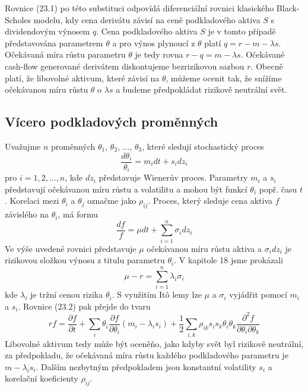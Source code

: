 \documentclass[a4paper]{book}
\begin{document}
Rovnice (23.1) po této substituci odpovídá diferenciální rovnici klasického Black-Scholes modelu, kdy cena derivátu závisí na ceně podkladového aktiva $S$ s dividendovým výnosem $q$. Cena podkladového aktiva $S$ je v tomto případě představována parametrem $\theta$ a pro výnos plynoucí z $\theta$ platí $q = r - m -\lambda s$. Očekávaná míra růstu parametru $\theta$ je tedy rovna $r - q = m - \lambda s$. Očekávané cash-flow generované derivátem diskontujeme bezrizikovou sazbou $r$. Obecně platí, že libovolné aktivum, které závisí na $\theta$, můžeme ocenit tak, že snížíme očekávanou míru růstu $\theta$ o $\lambda s$ a budeme předpokládat rizikově neutrální svět.

\subsection{Vícero podkladových proměnných}

Uvažujme $n$ proměnných $\theta_1$, $\theta_2$, ..., $\theta_3$, které sledují stochastický proces
\begin{equation*}
\frac{d \theta_i}{\theta_i} = m_i dt + s_i d z_i
\end{equation*}
pro $i = 1, 2, ..., n$, kde $dz_i$ představuje Wienerův proces. Parametry $m_i$ a $s_i$ představují očekávanou míru růstu a volatilitu a mohou být funkcí $\theta_i$ popř. času $t$. Korelaci mezi $\theta_i$ a $\theta_j$ označme jako $\rho_{ij}$. Proces, který sleduje cena aktiva $f$ závislého na $\theta_i$, má formu
\begin{equation*}
\frac{df}{f}=\mu dt + \sum^n_{i=1}\sigma_i dz_i
\end{equation*}
Ve výše uvedené rovnici představuje $\mu$ očekávanou míru růstu aktiva a $\sigma_i dz_i$ je rizikovou složkou výnosu z titulu parametru $\theta_i$. V kapitole 18 jsme prokázali
\begin{equation}
\mu - r = \sum^n_{i=1}\lambda_i \sigma_i
\end{equation}
kde $\lambda_i$ je tržní cenou rizika $\theta_i$. S využitím It\^o lemy lze $\mu$ a $\sigma_i$ vyjádřit pomocí $m_i$ a $s_i$. Rovnice (23.2) pak přejde do tvaru
\begin{equation*}
rf = \frac{\partial f}{\partial t} + \sum_i \theta_i \frac{\partial f}{\partial \theta_i}(m_i - \lambda_i s_i)+ \frac{1}{2}\sum_{i,k}\rho_{ik}s_i s_k \theta_i \theta_k \frac{\partial^2 f}{\partial \theta_i \partial \theta_k}
\end{equation*}
Libovolné aktivum tedy může být oceněňo, jako kdyby svět byl rizikově neutrální, za předpokladu, že očekávaná míra růstu každého podkladového parametru je $m - \lambda_i s_i$. Dalším nezbytným předpokladem jsou konstantní volatility $s_i$ a korelační koeficienty $\rho_{ij}$.
\end{document}
